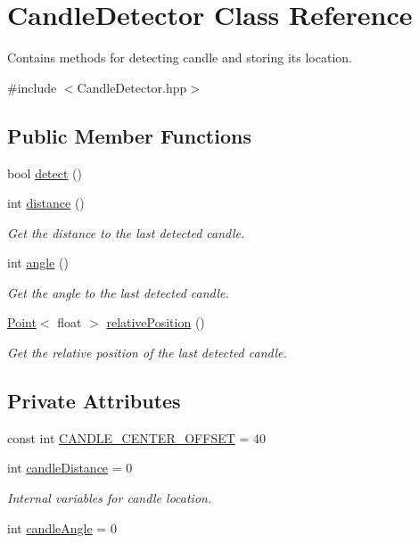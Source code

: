 \hypertarget{classCandleDetector}{\section{Candle\-Detector Class Reference}
\label{classCandleDetector}
}


Contains methods for detecting candle and storing its location.  




{\ttfamily \#include $<$Candle\-Detector.\-hpp$>$}

\subsection*{Public Member Functions}
\begin{DoxyCompactItemize}
\item 
bool \hyperlink{classCandleDetector_a8b9d654f3be7f3ae44d4e1fc07d08b51}{detect} ()
\item 
int \hyperlink{classCandleDetector_a01619df190ca44d8171055b49e81444f}{distance} ()
\begin{DoxyCompactList}\small\item\em Get the distance to the last detected candle. \end{DoxyCompactList}\item 
int \hyperlink{classCandleDetector_a69d5ea11e04eaa51214c3a786eec7455}{angle} ()
\begin{DoxyCompactList}\small\item\em Get the angle to the last detected candle. \end{DoxyCompactList}\item 
\hyperlink{classPoint}{Point}$<$ float $>$ \hyperlink{classCandleDetector_a773abb6491519a0d1b7111e2973c7199}{relative\-Position} ()
\begin{DoxyCompactList}\small\item\em Get the relative position of the last detected candle. \end{DoxyCompactList}\end{DoxyCompactItemize}
\subsection*{Private Attributes}
\begin{DoxyCompactItemize}
\item 
const int \hyperlink{classCandleDetector_a9920f067f44f9dc8aab6747699a244f7}{C\-A\-N\-D\-L\-E\-\_\-\-C\-E\-N\-T\-E\-R\-\_\-\-O\-F\-F\-S\-E\-T} = 40
\item 
int \hyperlink{classCandleDetector_a3d4f2c951c77838bfc5c068b58cf9fda}{candle\-Distance} = 0
\begin{DoxyCompactList}\small\item\em Internal variables for candle location. \end{DoxyCompactList}\item 
int \hyperlink{classCandleDetector_a043c3f35890b36e187734a492f96f84c}{candle\-Angle} = 0
\end{DoxyCompactItemize}
